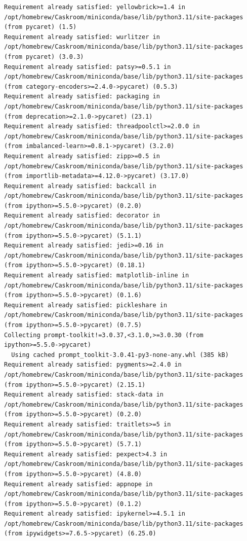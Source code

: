 \documentclass[
  letterpaper,
  DIV=11,
  numbers=noendperiod]{scrartcl}
\begin{document}
\begin{verbatim}
Requirement already satisfied: yellowbrick>=1.4 in /opt/homebrew/Caskroom/miniconda/base/lib/python3.11/site-packages (from pycaret) (1.5)
Requirement already satisfied: wurlitzer in /opt/homebrew/Caskroom/miniconda/base/lib/python3.11/site-packages (from pycaret) (3.0.3)
Requirement already satisfied: patsy>=0.5.1 in /opt/homebrew/Caskroom/miniconda/base/lib/python3.11/site-packages (from category-encoders>=2.4.0->pycaret) (0.5.3)
Requirement already satisfied: packaging in /opt/homebrew/Caskroom/miniconda/base/lib/python3.11/site-packages (from deprecation>=2.1.0->pycaret) (23.1)
Requirement already satisfied: threadpoolctl>=2.0.0 in /opt/homebrew/Caskroom/miniconda/base/lib/python3.11/site-packages (from imbalanced-learn>=0.8.1->pycaret) (3.2.0)
Requirement already satisfied: zipp>=0.5 in /opt/homebrew/Caskroom/miniconda/base/lib/python3.11/site-packages (from importlib-metadata>=4.12.0->pycaret) (3.17.0)
Requirement already satisfied: backcall in /opt/homebrew/Caskroom/miniconda/base/lib/python3.11/site-packages (from ipython>=5.5.0->pycaret) (0.2.0)
Requirement already satisfied: decorator in /opt/homebrew/Caskroom/miniconda/base/lib/python3.11/site-packages (from ipython>=5.5.0->pycaret) (5.1.1)
Requirement already satisfied: jedi>=0.16 in /opt/homebrew/Caskroom/miniconda/base/lib/python3.11/site-packages (from ipython>=5.5.0->pycaret) (0.18.1)
Requirement already satisfied: matplotlib-inline in /opt/homebrew/Caskroom/miniconda/base/lib/python3.11/site-packages (from ipython>=5.5.0->pycaret) (0.1.6)
Requirement already satisfied: pickleshare in /opt/homebrew/Caskroom/miniconda/base/lib/python3.11/site-packages (from ipython>=5.5.0->pycaret) (0.7.5)
Collecting prompt-toolkit!=3.0.37,<3.1.0,>=3.0.30 (from ipython>=5.5.0->pycaret)
  Using cached prompt_toolkit-3.0.41-py3-none-any.whl (385 kB)
Requirement already satisfied: pygments>=2.4.0 in /opt/homebrew/Caskroom/miniconda/base/lib/python3.11/site-packages (from ipython>=5.5.0->pycaret) (2.15.1)
Requirement already satisfied: stack-data in /opt/homebrew/Caskroom/miniconda/base/lib/python3.11/site-packages (from ipython>=5.5.0->pycaret) (0.2.0)
Requirement already satisfied: traitlets>=5 in /opt/homebrew/Caskroom/miniconda/base/lib/python3.11/site-packages (from ipython>=5.5.0->pycaret) (5.7.1)
Requirement already satisfied: pexpect>4.3 in /opt/homebrew/Caskroom/miniconda/base/lib/python3.11/site-packages (from ipython>=5.5.0->pycaret) (4.8.0)
Requirement already satisfied: appnope in /opt/homebrew/Caskroom/miniconda/base/lib/python3.11/site-packages (from ipython>=5.5.0->pycaret) (0.1.2)
Requirement already satisfied: ipykernel>=4.5.1 in /opt/homebrew/Caskroom/miniconda/base/lib/python3.11/site-packages (from ipywidgets>=7.6.5->pycaret) (6.25.0)

\end{verbatim}
\end{document}
